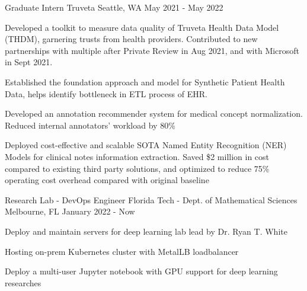 \begin{cventries}

	\cventry
	{Graduate Intern}
	{Truveta}
	{Seattle, WA}
	{May 2021 - May 2022}
	{\begin{cvitems}
			\item {Developed a toolkit to measure data quality of Truveta Health Data Model (THDM), garnering trusts from health providers. Contributed to new partnerships with multiple after Private Review in Aug 2021, and with Microsoft in Sept 2021.}
			\item {Established the foundation approach and model for Synthetic Patient Health Data, helps identify bottleneck in ETL process of EHR.}
			\item {Developed an annotation recommender system for medical concept normalization. Reduced internal annotators' workload by 80\%}
			\item {Deployed cost-effective and scalable SOTA Named Entity Recognition (NER) Models for clinical notes information extraction. Saved \$2 million in cost compared to existing third party solutions, and optimized to reduce 75\% operating cost overhead compared with original baseline}
		\end{cvitems}}
	\vspace{-3mm}

	\cventry
	{Research Lab - DevOps Engineer}
	{Florida Tech - Dept. of Mathematical Sciences}
	{Melbourne, FL}
	{January 2022 - Now}
	{\begin{cvitems}
			\item {Deploy and maintain servers for deep learning lab lead by Dr. Ryan T. White}
			\item {Hosting on-prem Kubernetes cluster with MetalLB loadbalancer}
			\item {Deploy a multi-user Jupyter notebook with GPU support for deep learning researches}
		\end{cvitems}}
	\vspace{-5mm}


\end{cventries}
